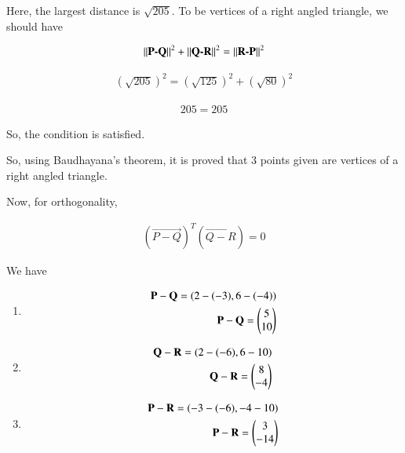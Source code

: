 \documentclass[journal,12pt,twocolumn]{IEEEtran}
\begin{document}
Here, the largest distance is $\sqrt{205}$. To be vertices of a right angled triangle, we should have 



\begin{align}
  \left\lVert\textbf{P-Q}\right\rVert^2 + \left\lVert\textbf{Q-R}\right\rVert^2 = \left\lVert\textbf{R-P}\right\rVert^2
\end{align}

\begin{align}
  (\sqrt{205})^2 = (\sqrt{125})^2 + (\sqrt{80})^2
\end{align}


\begin{align}
  205 = 205
\end{align}

So, the condition is satisfied. 

So, using Baudhayana's theorem, it is proved that 3 points given are vertices of a right angled triangle. 

Now, for orthogonality, 

\begin{align}
    (\vec{P-Q})^T(\vec{Q-R}) = 0
\end{align}

We have 


\begin{enumerate}
    
    \item \begin{align}
    \mathbf{P-Q} = (2-(-3), 6-(-4))
\\
\mathbf{P-Q} = \begin{pmatrix}
5\\
10 
\end{pmatrix}
\end{align}

    \item \begin{align}
    \mathbf{Q-R} = (2-(-6), 6-10)
\\
\mathbf{Q-R} = \begin{pmatrix}
8\\
-4 
\end{pmatrix}
\end{align}

\item \begin{align}
    \mathbf{P-R} = (-3-(-6), -4-10)
\\
\mathbf{P-R} = \begin{pmatrix}
3\\
-14 
\end{pmatrix}
\end{align}

\end{enumerate}


\end{document}
